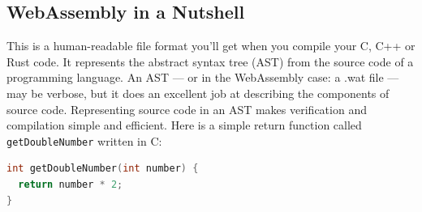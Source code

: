 \documentclass[10pt]{article}
\begin{document}
\begin{sloppypar}
  \subsection{WebAssembly in a Nutshell}
  \label{sec:webassembly-text-format}

  This is a human-readable file format you’ll get when you compile your C, C++ or Rust code. It represents the abstract syntax tree (AST) from the source code of a programming language. An AST — or in the WebAssembly case: a .wat file — may be verbose, but it does an excellent job at describing the components of source code. Representing source code in an AST makes verification and compilation simple and efficient. Here is a simple return function called \lstinline{getDoubleNumber} written in C:

  \begin{lstlisting}[language=C, caption=Python example, label=lst:python-example]
int getDoubleNumber(int number) {
  return number * 2;
}
\end{lstlisting}

  \pagebreak
  
  
\end{sloppypar}
\end{document}
